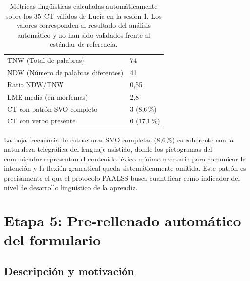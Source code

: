 \begin{table}[h]
  \footnotesize
  \renewcommand{\arraystretch}{1.3}
  \setlength{\tabcolsep}{4pt}
  \begin{center}
  \begin{tabular}{|L{7cm}|L{2cm}|}
  \hline
   &  \\ \hline
  TNW (Total de palabras)                    & 74   \\ \hline
  NDW (Número de palabras diferentes)        & 41   \\ \hline
  Ratio NDW/TNW                              & 0{,}55 \\ \hline
  LME media (en morfemas)                    & 2{,}8 \\ \hline
  \ac{CT} con patrón SVO completo            & 3 (8{,}6\,\%) \\ \hline
  \ac{CT} con verbo presente                 & 6 (17{,}1\,\%) \\ \hline
  \end{tabular}
  \end{center}
  \caption[Métricas PAALSS sesión 1]{Métricas lingüísticas calculadas automáticamente
    sobre los 35~\ac{CT} válidos de Lucía en la sesión 1. Los valores corresponden al
    resultado del análisis automático y no han sido validados frente al estándar de
    referencia.}
  \label{tab:metricas_vocabulario}
\end{table}

La baja frecuencia de estructuras \ac{SVO} completas (8{,}6\,\%) es coherente con la
naturaleza telegráfica del lenguaje asistido, donde los pictogramas del comunicador
representan el contenido léxico mínimo necesario para comunicar la intención y la
flexión gramatical queda sistemáticamente omitida. Este patrón es precisamente el que
el protocolo \ac{PAALSS} busca cuantificar como indicador del nivel de desarrollo
lingüístico de la aprendiz.


\section{Etapa 5: Pre-rellenado automático del formulario}
\label{sec:etapa_rag}

\subsection{Descripción y motivación}
\label{subsec:rag_desc}

